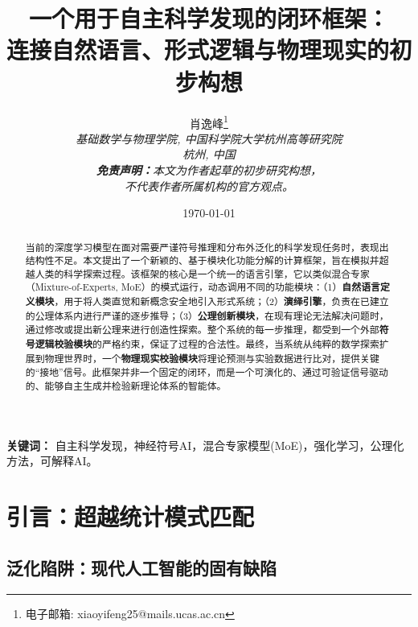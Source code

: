 \documentclass[11pt, a4paper]{article}
\begin{document}
	
	\title{\textbf{一个用于自主科学发现的闭环框架：\\连接自然语言、形式逻辑与物理现实的初步构想}}
	\author{
		肖逸峰\thanks{电子邮箱: xiaoyifeng25@mails.ucas.ac.cn} \\
		\textit{\small 基础数学与物理学院, 中国科学院大学杭州高等研究院}\\
		\textit{\small 杭州, 中国}\\
		\vspace{1em}
		\textit{\small \textbf{免责声明：}本文为作者起草的初步研究构想，} \\
		\textit{\small 不代表作者所属机构的官方观点。}
	}
	\date{\today} %
	
	\maketitle %
	
\begin{abstract}
	当前的深度学习模型在面对需要严谨符号推理和分布外泛化的科学发现任务时，表现出结构性不足。本文提出了一个新颖的、基于模块化功能分解的计算框架，旨在模拟并超越人类的科学探索过程。该框架的核心是一个统一的语言引擎，它以类似混合专家（Mixture-of-Experts, MoE）的模式运行，动态调用不同的功能模块：（1）\textbf{自然语言定义模块}，用于将人类直觉和新概念安全地引入形式系统；（2）\textbf{演绎引擎}，负责在已建立的公理体系内进行严谨的逐步推导；（3）\textbf{公理创新模块}，在现有理论无法解决问题时，通过修改或提出新公理来进行创造性探索。整个系统的每一步推理，都受到一个外部\textbf{符号逻辑校验模块}的严格约束，保证了过程的合法性。最终，当系统从纯粹的数学探索扩展到物理世界时，一个\textbf{物理现实校验模块}将理论预测与实验数据进行比对，提供关键的“接地”信号。此框架并非一个固定的闭环，而是一个可演化的、通过可验证信号驱动的、能够自主生成并检验新理论体系的智能体。
\end{abstract}

\noindent\textbf{关键词：} 自主科学发现，神经符号AI，混合专家模型(MoE)，强化学习，公理化方法，可解释AI。

\vspace{2em}


\section{引言：超越统计模式匹配}



\subsection{泛化陷阱：现代人工智能的固有缺陷}
\end{document}
